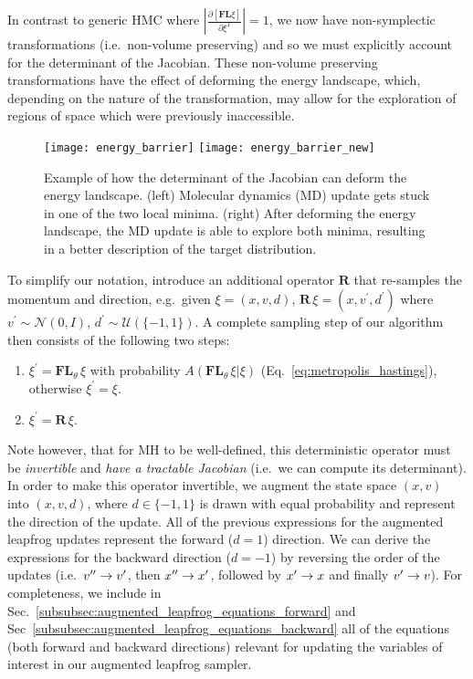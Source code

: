 \documentclass[../main.tex]{subfiles}
\begin{document}
In contrast to generic HMC where $\left|\frac{\partial\left[\mathbf{F}\mathbf{L}\xi\right]} {\partial\xi^{T}}\right| =
1$, we now have non-symplectic transformations (i.e.\ non-volume preserving) and so we must explicitly account for the
determinant of the Jacobian.
%
These non-volume preserving transformations have the effect of deforming the energy landscape, which, depending on the
nature of the transformation, may allow for the exploration of regions of space which were previously inaccessible.
%
\begin{figure}[htpb]
    \centering
    \texttt{[image: energy\_barrier]}
    \texttt{[image: energy\_barrier\_new]}
    \caption{Example of how the determinant of the Jacobian can deform the
      energy landscape. (left) Molecular dynamics (MD) update gets stuck in
      one of the two local minima. (right) After deforming the energy
      landscape, the MD update is able to explore both minima, resulting in a
      better description of the target 
      distribution.}\label{fig:energy_barrier}
\end{figure}
%
To simplify our notation, introduce an additional operator $\mathbf{R}$ that re-samples the momentum and direction,
e.g.\ given $\xi = (x, v, d)$, $\mathbf{R}\,\xi = (x, v^{\prime}, d^{\prime})$ where $v^{\prime} \sim \mathcal{N}(0,
I)$, $d^{\prime} \sim \mathcal{U}\left(\{-1, 1\}\right)$.
%
A complete sampling step of our algorithm then consists of the following two steps:
%
\begin{enumerate}
    \item $\xi^{\prime} = \mathbf{FL}_{\theta} \,\xi$ with probability
        $A(\mathbf{FL}_{\theta}\,\xi|\xi)$ (Eq.~\ref{eq:metropolis_hastings}),
        otherwise $\xi^{\prime} = \xi$.
    \item $\xi^{\prime} = \mathbf{R}\,\xi$.
\end{enumerate}
%
Note however, that for MH to be well-defined, this deterministic operator must be \emph{invertible} and \emph{have a
tractable Jacobian} (i.e.\ we can compute its determinant).
%
In order to make this operator invertible, we augment the state space $(x, v)$ into $(x, v, d)$, where $d \in \{-1,
1\}$ is drawn with equal probability and represent the direction of the update.
%
All of the previous expressions for the augmented leapfrog updates represent the forward ($d = 1$) direction.
%
We can derive the expressions for the backward direction ($d = -1$) by reversing the order of the updates (i.e.\ ${v^{\prime\prime}}
\rightarrow {v^{\prime}}$, then ${x^{\prime\prime}} \rightarrow {x^{\prime}}$, followed by ${x^{\prime}} \rightarrow x$ and finally ${v^{\prime}} \rightarrow v$).
%
For completeness, we include in Sec.~\ref{subsubsec:augmented_leapfrog_equations_forward} and
Sec~\ref{subsubsec:augmented_leapfrog_equations_backward} all of the equations (both forward and backward directions)
relevant for updating the variables of interest in our augmented leapfrog sampler.
\end{document}
